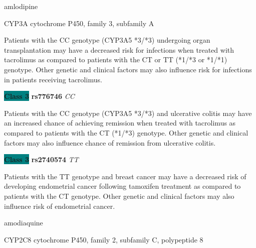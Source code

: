 \documentclass{resume} %
\begin{document}
\begin{rSection}{ amlodipine }
\begin{rSubsection}{ CYP3A }{ cytochrome P450, family 3, subfamily A }{}{}
\item[] Patients with the CC genotype (CYP3A5 *3/*3) undergoing organ transplantation may have a decreased risk for infections when treated with tacrolimus as compared to patients with the CT or TT (*1/*3 or *1/*1) genotype. Other genetic and clinical factors may also influence risk for infections in patients receiving tacrolimus.\item \textbf{\colorbox{teal} {Class 3}} \textbf{ rs776746 } \textit{ CC }
\item[] Patients with the CC genotype (CYP3A5 *3/*3) and ulcerative colitis may have an increased chance of achieving remission when treated with tacrolimus as compared to patients with the CT (*1/*3) genotype. Other genetic and clinical factors may also influence chance of remission from ulcerative colitis. \item \textbf{\colorbox{teal} {Class 3}} \textbf{ rs2740574 } \textit{ TT }
\item[] Patients with the TT genotype and breast cancer may have a decreased risk of developing endometrial cancer following tamoxifen treatment as compared to patients with the CT genotype. Other genetic and clinical factors may also influence risk of endometrial cancer.
\end{rSubsection}

\end{rSection}\begin{rSection}{ amodiaquine }
\item[]

\begin{rSubsection}{ CYP2C8 }{ cytochrome P450, family 2, subfamily C, polypeptide 8 }{}{}
\item[]


\end{rSubsection}
\end{rSection}
\end{document}

